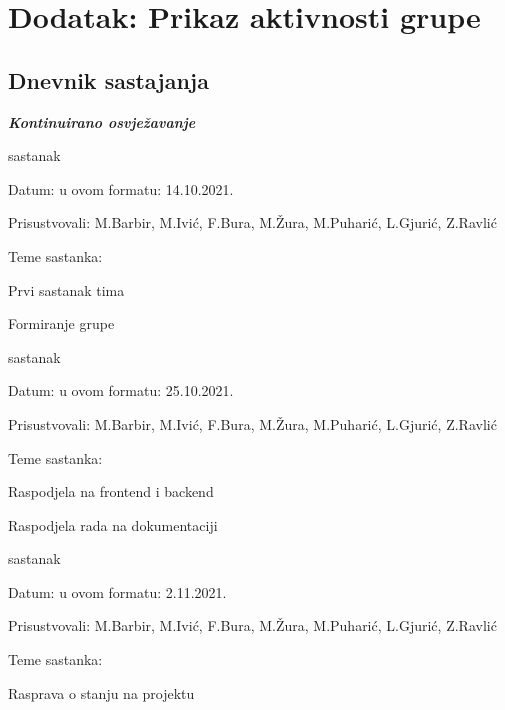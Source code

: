 \chapter*{Dodatak: Prikaz aktivnosti grupe}
		
		\section*{Dnevnik sastajanja}
		
		\textbf{\textit{Kontinuirano osvježavanje}}\\
		
		
		\begin{packed_enum}
				\item  sastanak
			
			\item[] \begin{packed_item}
				\item Datum: u ovom formatu: 14.10.2021.
				\item Prisustvovali: M.Barbir, M.Ivić, F.Bura, M.Žura, M.Puharić, L.Gjurić, Z.Ravlić
				\item Teme sastanka:
				\begin{packed_item}
					\item  Prvi sastanak tima
					\item  Formiranje grupe
				\end{packed_item}
			\end{packed_item}
			\item  sastanak
		
		\item[] \begin{packed_item}
			\item Datum: u ovom formatu: 25.10.2021.
			\item Prisustvovali: M.Barbir, M.Ivić, F.Bura, M.Žura, M.Puharić, L.Gjurić, Z.Ravlić
			\item Teme sastanka:
			\begin{packed_item}
				\item  Raspodjela na frontend i backend
				\item  Raspodjela rada na dokumentaciji
			\end{packed_item}
		\end{packed_item}
			\item  sastanak
			
			\item[] \begin{packed_item}
				\item Datum: u ovom formatu: 2.11.2021.
				\item Prisustvovali: M.Barbir, M.Ivić, F.Bura, M.Žura, M.Puharić, L.Gjurić, Z.Ravlić
				\item Teme sastanka:
				\begin{packed_item}
					\item  Rasprava o stanju na projektu
				\end{packed_item}
			\end{packed_item}
			

\end{packed_enum}

